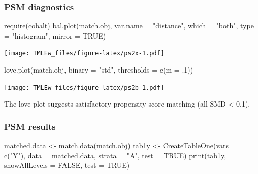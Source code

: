 \documentclass[
]{book}
\newenvironment{Shaded}{\begin{snugshade}}{\end{snugshade}}
\newcommand{\AttributeTok}[1]{\textcolor[rgb]{0.77,0.63,0.00}{#1}}
\newcommand{\ConstantTok}[1]{\textcolor[rgb]{0.00,0.00,0.00}{#1}}
\newcommand{\DecValTok}[1]{\textcolor[rgb]{0.00,0.00,0.81}{#1}}
\newcommand{\FunctionTok}[1]{\textcolor[rgb]{0.00,0.00,0.00}{#1}}
\newcommand{\NormalTok}[1]{#1}
\newcommand{\OtherTok}[1]{\textcolor[rgb]{0.56,0.35,0.01}{#1}}
\newcommand{\StringTok}[1]{\textcolor[rgb]{0.31,0.60,0.02}{#1}}
\begin{document}
\hypertarget{psm-diagnostics}{%
\subsubsection{PSM diagnostics}\label{psm-diagnostics}}

\begin{Shaded}
\begin{Highlighting}[]
\FunctionTok{require}\NormalTok{(cobalt)}
\FunctionTok{bal.plot}\NormalTok{(match.obj, }
         \AttributeTok{var.name =} \StringTok{"distance"}\NormalTok{, }
         \AttributeTok{which =} \StringTok{"both"}\NormalTok{,}
         \AttributeTok{type =} \StringTok{"histogram"}\NormalTok{, }
         \AttributeTok{mirror =} \ConstantTok{TRUE}\NormalTok{)}
\end{Highlighting}
\end{Shaded}

\texttt{[image: TMLEw\_files/figure-latex/ps2x-1.pdf]}

\begin{Shaded}
\begin{Highlighting}[]
\FunctionTok{love.plot}\NormalTok{(match.obj, }\AttributeTok{binary =} \StringTok{"std"}\NormalTok{,}
          \AttributeTok{thresholds =} \FunctionTok{c}\NormalTok{(}\AttributeTok{m =}\NormalTok{ .}\DecValTok{1}\NormalTok{))}
\end{Highlighting}
\end{Shaded}

\texttt{[image: TMLEw\_files/figure-latex/ps2b-1.pdf]}

The love plot suggests satisfactory propensity score matching (all SMD \textless{} 0.1).

\hypertarget{psm-results}{%
\subsubsection{PSM results}\label{psm-results}}

\begin{Shaded}
\begin{Highlighting}[]
\NormalTok{matched.data }\OtherTok{\textless{}{-}} \FunctionTok{match.data}\NormalTok{(match.obj)}
\NormalTok{tab1y }\OtherTok{\textless{}{-}} \FunctionTok{CreateTableOne}\NormalTok{(}\AttributeTok{vars =} \FunctionTok{c}\NormalTok{(}\StringTok{"Y"}\NormalTok{),}
               \AttributeTok{data =}\NormalTok{ matched.data, }\AttributeTok{strata =} \StringTok{"A"}\NormalTok{, }
               \AttributeTok{test =} \ConstantTok{TRUE}\NormalTok{)}
\FunctionTok{print}\NormalTok{(tab1y, }\AttributeTok{showAllLevels =} \ConstantTok{FALSE}\NormalTok{, }
      \AttributeTok{test =} \ConstantTok{TRUE}\NormalTok{)}
\end{Highlighting}
\end{Shaded}
\end{document}

